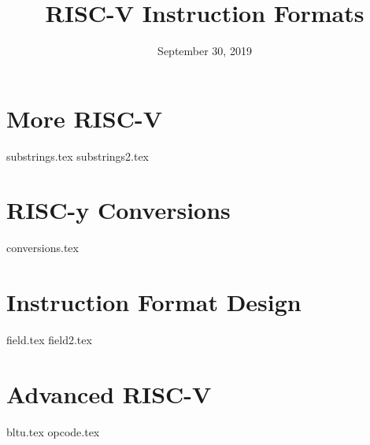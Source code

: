 \documentclass[11pt]{exam}
\title{RISC-V Instruction Formats}
\date{September 30, 2019}
\begin{document}
\maketitle

\section{More RISC-V}
\begin{questions}
{substrings.tex}
{substrings2.tex}
\end{questions}

\section{RISC-y Conversions}
\begin{questions}
{conversions.tex}
\end{questions}
\newpage

\section{Instruction Format Design}
\begin{questions}
{field.tex}
{field2.tex}
\end{questions}
\newpage

\section{Advanced RISC-V}
\begin{questions}
{bltu.tex}
{opcode.tex}
\end{questions}
\newpage
\end{document}
